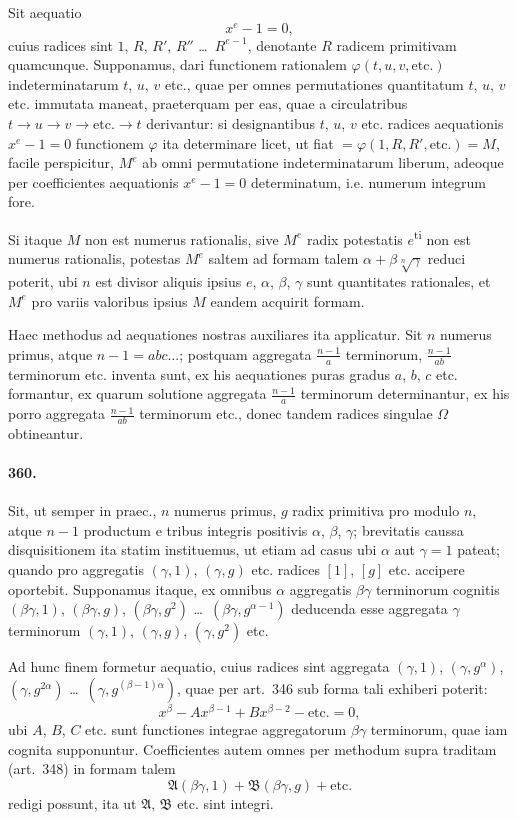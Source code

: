 \documentclass[12pt,a4paper]{article}
\theoremstyle{plain}
\theoremstyle{definition}
\theoremstyle{remark}
\begin{document}
Sit aequatio
\[
x^e - 1 = 0,
\]
cuius radices sint $1$, $R$, $R'$, $R''$ \ldots\ $R^{e-1}$, denotante $R$
radicem primitivam quamcunque. Supponamus, dari functionem rationalem
$\varphi(t, u, v, \text{etc.})$ indeterminatarum $t$, $u$, $v$ etc., quae per omnes
permutationes quantitatum $t$, $u$, $v$ etc. immutata maneat, praeterquam per
eas, quae a circulatribus $t \to u \to v \to \text{etc.} \to t$ derivantur:
si designantibus $t$, $u$, $v$ etc. radices aequationis $x^e - 1 = 0$ functionem
$\varphi$ ita determinare licet, ut fiat $= \varphi(1, R, R', \text{etc.}) = M$,
facile perspicitur, $M^e$ ab omni permutatione indeterminatarum liberum, adeoque
per coefficientes aequationis $x^e - 1 = 0$ determinatum, i.e. numerum
integrum fore.

Si itaque $M$ non est numerus rationalis, sive $M^e$ radix potestatis $e$\textsuperscript{ti}
non est numerus rationalis, potestas $M^e$ saltem ad formam talem
$\alpha + \beta\sqrt[n]{\gamma}$ reduci poterit, ubi $n$ est divisor aliquis ipsius $e$,
$\alpha$, $\beta$, $\gamma$ sunt quantitates rationales, et $M^e$ pro variis
valoribus ipsius $M$ eandem acquirit formam.

Haec methodus ad aequationes nostras auxiliares ita applicatur. Sit $n$
numerus primus, atque $n-1 = abc\ldots$; postquam aggregata
$\frac{n-1}{a}$ terminorum, $\frac{n-1}{ab}$ terminorum etc. inventa sunt, ex
his aequationes puras gradus $a$, $b$, $c$ etc. formantur, ex quarum solutione
aggregata $\frac{n-1}{a}$ terminorum determinantur, ex his porro aggregata
$\frac{n-1}{ab}$ terminorum etc., donec tandem radices singulae $\Omega$ obtineantur.


\paragraph{360.}
Sit, ut semper in praec., $n$ numerus primus, $g$ radix primitiva pro modulo
$n$, atque $n-1$ productum e tribus integris positivis $\alpha$, $\beta$, $\gamma$;
brevitatis caussa disquisitionem ita statim instituemus, ut etiam ad casus ubi
$\alpha$ aut $\gamma = 1$ pateat; quando pro aggregatis $(\gamma, 1)$,
$(\gamma, g)$ etc. radices $[1]$, $[g]$ etc. accipere oportebit. Supponamus itaque,
ex omnibus $\alpha$ aggregatis $\beta\gamma$ terminorum cognitis
$(\beta\gamma, 1)$, $(\beta\gamma, g)$, $(\beta\gamma, g^2)$ \ldots\ $(\beta\gamma, g^{\alpha-1})$
deducenda esse aggregata $\gamma$ terminorum $(\gamma, 1)$, $(\gamma, g)$,
$(\gamma, g^2)$ etc.

Ad hunc finem formetur aequatio, cuius radices sint aggregata
$(\gamma, 1)$, $(\gamma, g^{\alpha})$, $(\gamma, g^{2\alpha})$ \ldots\ $(\gamma, g^{(\beta-1)\alpha})$,
quae per art.~346 sub forma tali exhiberi poterit:
\[
x^{\beta} - Ax^{\beta-1} + Bx^{\beta-2} - \text{etc.} = 0,
\]
ubi $A$, $B$, $C$ etc. sunt functiones integrae aggregatorum $\beta\gamma$
terminorum, quae iam cognita supponuntur. Coefficientes autem omnes per
methodum supra traditam (art.~348) in formam talem
\[
\mathfrak{A}(\beta\gamma, 1) + \mathfrak{B}(\beta\gamma, g) + \text{etc.}
\]
redigi possunt, ita ut $\mathfrak{A}$, $\mathfrak{B}$ etc. sint integri.
\end{document}
